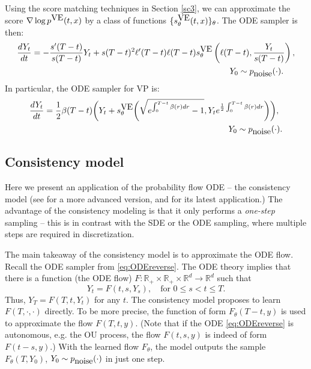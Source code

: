 \documentclass[letterpaper,11pt,reqno]{amsart}
\numberwithin{equation}{section}
\begin{document}
\quad Using the score matching techniques in Section \ref{sc3}, 
we can approximate the score $\nabla \log p^{\tiny \mbox{VE}}(t,x)$ by a class of functions $\{s_\theta^{\tiny \mbox{VE}}(t,x)\}_{\theta}$.
The ODE sampler is then:
\begin{equation}
\begin{aligned}
\frac{dY_t}{dt} = -\frac{s'(T-t)}{s(T-t)} Y_t + s(T-t)^2 \ell'(T-t) \ell(T-t) & s_\theta^{\tiny \mbox{VE}}\left( \ell(T-t), \frac{Y_t}{s(T-t)}\right),\\
& \qquad \qquad Y_0 \sim p_{\tiny \mbox{noise}}(\cdot).
\end{aligned}
\end{equation}
In particular, the ODE sampler for VP is:
\begin{equation*}
\begin{aligned}
\frac{dY_t}{dt} = \frac{1}{2} \beta(T-t)  \bigg(Y_t + s_\theta^{\tiny \mbox{VE}} \bigg(\sqrt{e^{\int_0^{T-t} \beta(r) dr} - 1},  Y_t & e^{\frac{1}{2}\int_0^{T-t} \beta(r) dr}\bigg) \bigg), \\
& \quad \,\,\,  Y_0 \sim p_{\tiny \mbox{noise}}(\cdot).
\end{aligned}
\end{equation*}

\subsection{Consistency model}
\label{sc62}

Here we present an application of the probability flow ODE --
the consistency model \cite{SDC23} 
(see \cite{Kim23, song2023improved} for a more advanced version,
and \cite{LCM} for its latest application.)
The advantage of the consistency modeling 
is that it only performs a {\em one-step} sampling
-- 
this is in contrast with the SDE or the ODE sampling,
where multiple steps are required in discretization.

\quad The main takeaway
of the consistency model is to approximate the ODE flow. 
Recall the ODE sampler from \eqref{eq:ODEreverse}. 
 The ODE theory implies that 
there is a function (the ODE flow) 
$F: \mathbb{R}_{+} \times \mathbb{R}_{+} \times \mathbb{R}^d \to \mathbb{R}^d$ such that 
\begin{equation}
\label{eq:groupprop}
Y_t = F(t,s,Y_s), \quad \mbox{for } 0 \le s< t \le T.
\end{equation}
Thus, $Y_T = F(T, t, Y_t)$ for any $t$.
The consistency model proposes to learn 
$F(T, \cdot, \cdot)$ directly.
To be more precise,
the function of form
$F_\theta(T-t, y)$
is used to approximate the flow $F(T, t, y)$.
(Note that if the ODE \eqref{eq:ODEreverse} is autonomous, e.g. the OU process,
the flow $F(t,s, y)$ is indeed of form $F(t-s, y)$.)
With the learned flow $F_\theta$,
the model outputs 
the sample $F_\theta(T, Y_0)$,
$Y_0 \sim p_{\tiny \mbox{noise}}(\cdot)$
in just one step.
\end{document}
